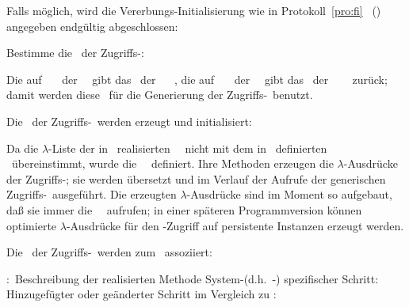 \begin{infol}
\begin{block}
\begin{block}
%
\item Falls m\"{o}glich, wird die Vererbungs-Initialisierung wie in
Protokoll~\ref{pro:fi}
\ (\citepage{\pageref{pro:fi}}) angegeben
endg\"{u}ltig abgeschlossen:\\
%
\item\label{enu:dcmcl} Bestimme die \mtdmc\ der
Zugriffs-\mtd[n]:\addeditem\\
\item[\plobmtdchar] Die auf
\ \spc\ \mtd\ der
\gfn[n]\ \ gibt das
\mtdmo\ der \spc[n]\ \mtdmc\ %
,
die auf \ \spc\ \mtd\ der
\gfn[n]\ \ gibt das \mtdmo\ der
\spc[n]\ \mtdmc\ \ %
zur\"{u}ck;
damit werden diese \mtdmc[n]\ f\"{u}r die Generierung der
Zugriffs-\mtd[n]\ benutzt.
%
\item\label{enu:dcmcr} Die \mtdmo[e]\ der Zugriffs-\mtd[n]\ werden
erzeugt und initialisiert:\addeditem\\
\item[\plobmtdchar] Da die $\lambda$-Liste der in \lw\ realisierten
\gfn[n]\ \ nicht mit dem in
\ definierten \std\ \"{u}ber\-ein\-stimmt, wurde die
\gfn\ \ definiert. Ihre
Methoden erzeugen die $\lambda$-Ausdr\"{u}cke der Zugriffs-\mtdmo[e]; sie
werden \"{u}ber\-setzt und im Verlauf der Aufrufe der generischen
Zugriffs-\fn[en]\ ausgef\"{u}hrt. Die erzeugten $\lambda$-Ausdr\"{u}cke sind
im Moment so aufgebaut, da\ss{} sie immer die
\gfn\ \ aufrufen;  
in einer sp\"{a}teren Programmversion k\"{o}n\-nen optimierte
$\lambda$-Ausdr\"{u}cke f\"{u}r den \Slt\/-Zugriff auf persistente Instanzen
erzeugt werden.
%
\item\label{enu:dcmad} Die \mtdmo[e]\ der Zugriffs-\mtd[n]\ werden zum
\clsmo\ assoziiert:\addeditem\\
%
\end{block}\end{block}
%
\vspace{1ex}\hspace{-\leftmargin}\parbox{\textwidth}{%
 \footnotesize%
%
 \plobmtdchar:~Beschreibung der realisierten Methode%
 \hspace*{\fill} System-(d.h.\ \mbox{\lw-)} spezifischer
 Schritt:~\lwclitemchar\\
%
 \hspace*{\fill} Hinzugef\"{u}gter oder ge\"{a}nderter Schritt im Vergleich
 zu \cite[]{bib:pa91b}:~\addeditemchar}
%
\end{infol}
